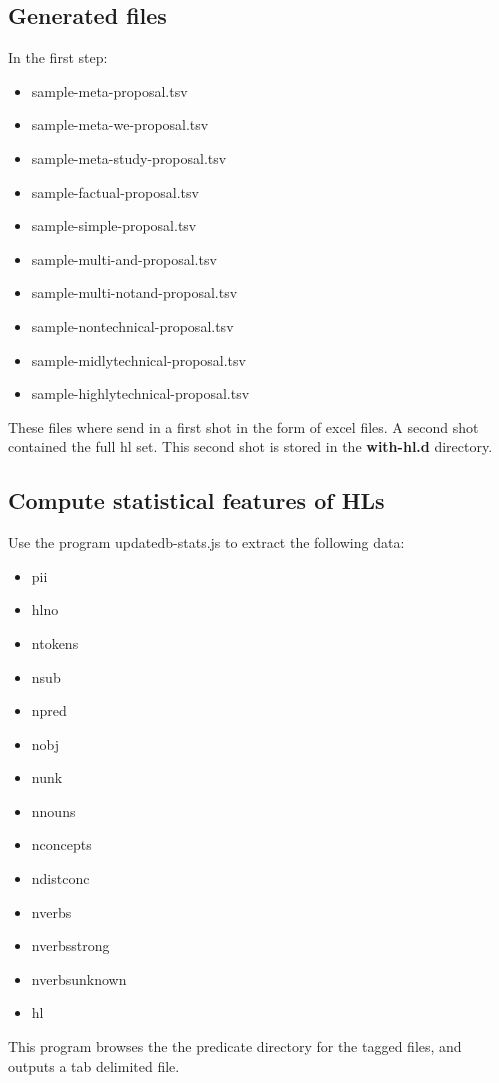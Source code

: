 \documentclass[a4paper,11pt]{report}
\newcommand{\cs}[1]{{\bfseries \ttfamily #1}}
\begin{document}
\subsection{Generated files}
In the first step:
\begin{itemize}
\item sample-meta-proposal.tsv
\item sample-meta-we-proposal.tsv
\item sample-meta-study-proposal.tsv
\item sample-factual-proposal.tsv
\item sample-simple-proposal.tsv
\item sample-multi-and-proposal.tsv
\item sample-multi-notand-proposal.tsv
\item sample-nontechnical-proposal.tsv
\item sample-midlytechnical-proposal.tsv
\item sample-highlytechnical-proposal.tsv
\end{itemize}

These files where send in a first shot in the form of excel files. A second shot contained the full hl set. This second shot is stored in the \cs{with-hl.d} directory.

\subsection*{Compute statistical features of HLs}
Use the program updatedb-stats.js to extract the following data:
\begin{itemize}
\item pii
\item hlno
\item ntokens
\item nsub
\item npred
\item nobj
\item nunk
\item nnouns
\item nconcepts
\item ndistconc
\item nverbs
\item nverbsstrong
\item nverbsunknown
\item hl
\end{itemize}
This program browses the the predicate directory for the tagged files, and outputs a tab delimited file.
\end{document}
